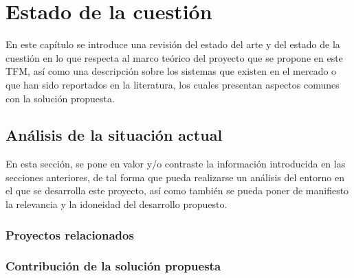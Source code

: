 \chapter{Estado de la cuestión}
\label{chapter:estado_cuestion}

En este capítulo se introduce una revisión del estado del arte y del estado de la cuestión en lo que respecta al marco teórico del proyecto que se propone en este TFM, así como una descripción sobre los sistemas que existen en el mercado o que han sido reportados en la literatura, los cuales presentan aspectos comunes con la solución propuesta.


\section{Análisis de la situación actual}

En esta sección, se pone en valor y/o contraste la información introducida en las secciones anteriores, de tal forma que pueda realizarse un análisis del entorno en el que se desarrolla este proyecto, así como también se pueda poner de manifiesto la relevancia y la idoneidad del desarrollo propuesto. 


\subsection{Proyectos relacionados}


\subsection{Contribución de la solución propuesta}

